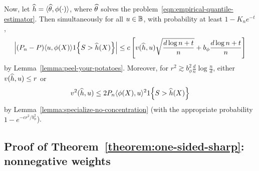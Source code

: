 \documentclass{article}
\newcommand{\radphi}{b_{\phi}}
\newcommand{\scorerv}{S}
\begin{document}
Now, let $\widehat{h} = \langle\widehat{\theta}, \phi(\cdot)\rangle$, where $\widehat{\theta}$
solves the problem~\eqref{eqn:empirical-quantile-estimator}.
%
Then simultaneously for all $u \in \mathbb{B}$,
with probability at least $1 - K_n e^{-t}$,
\begin{equation}
  \label{eqn:bart-ride}
  \left|(P_n - P)\<u, \phi(X)\> \indic{\scorerv > \what{h}(X)}\right|
  \le c \left[v(\what{h}, u)
    \sqrt{\frac{d \log n + t}{n}}
    + \radphi \frac{d \log n + t}{n}\right]
\end{equation}
by Lemma~\ref{lemma:peel-your-potatoes}.
Moreover, for $r^2 \gtrsim \radphi^2 \frac{d}{n} \log \frac{n}{d}$,
either $v(\widehat{h}, u) \le r$ or
\begin{equation*}
  v^2(\what{h}, u)
  \le 2 P_n \<\phi(X), u\>^2 \indic{\scorerv > \what{h}(X)}
\end{equation*}
by Lemma~\ref{lemma:specialize-no-concentration} (with the appropriate
probability $1 - e^{-cr^2 / \radphi^2}$).

\subsection{Proof of Theorem~\ref{theorem:one-sided-sharp}: nonnegative
  weights}
\label{sec:proof-one-sided-sharp}
\end{document}
